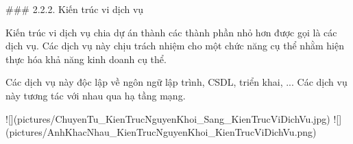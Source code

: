 
### 2.2.2. Kiến trúc vi dịch vụ

Kiến trúc vi dịch vụ chia dự án thành các thành phần nhỏ hơn được gọi là các dịch vụ.
Các dịch vụ này chịu trách nhiệm cho một chức năng cụ thể nhằm hiện thực hóa khả năng kinh doanh cụ thể.

Các dịch vụ này độc lập về ngôn ngữ lập trình, CSDL, triển khai, ...
Các dịch vụ này tương tác với nhau qua hạ tầng mạng.

![](pictures/ChuyenTu_KienTrucNguyenKhoi_Sang_KienTrucViDichVu.jpg)
![](pictures/AnhKhacNhau_KienTrucNguyenKhoi_KienTrucViDichVu.png)